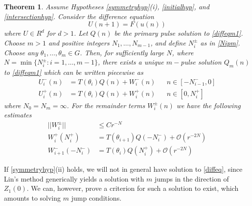 \documentclass[12pt]{article}
\newtheorem{theorem}{Theorem}
\begin{document}
\begin{theorem}\label{transversemulti}
Assume Hypotheses \ref{symmetryhyp}(i), \ref{initialhyp}, and \ref{intersectionhyp}. Consider the difference equation
\begin{equation}\label{diffeqm1}
U(n+1) = F(u(n))
\end{equation}
where $U \in R^d$ for $d > 1$. Let $Q(n)$ be the primary pulse solution to \eqref{diffeqm1}. Choose $m > 1$ and positive integers $N_1, \dots, N_{m-1}$, and define $N_i^\pm$ as in \eqref{Nipm}. Choose any $\theta_1, \dots, \theta_m \in G$. Then, for sufficiently large $N$, where $N = \min\{ N_i^\pm : i = 1, \dots, m-1 \}$, there exists a unique $m-$pulse solution $Q_m(n)$ to \eqref{diffeqm1} which can be written piecewise as 
\begin{align}
U_i^-(n) &= T(\theta_i) Q(n) + W_i^-(n) && n \in [-N_{i-1}^-, 0] \\
U_i^+(n) &= T(\theta_i) Q(n) + W_i^+(n) && n \in [0, N_i^+]
\end{align}
where $N_0 = N_m = \infty$. For the remainder terms $W_i^\pm(n)$ we have the following estimates
\begin{equation}\label{Westimates}
\begin{aligned}
||W_i^\pm|| &\leq C r^{-N} \\
W_i^+(N_i^+) &= T(\theta_{i+1}) Q(-N_i^-) + \mathcal{O}(r^{-2N}) \\
W_{i+1}^-(-N_i^-) &= T(\theta_i) Q(N_i^+) + \mathcal{O}(r^{-2N})
\end{aligned}
\end{equation}
\end{theorem}

If \ref{symmetryhyp}(ii) holds, we will not in general have solution to \eqref{diffeq}, since Lin's method generically yields a solution with $m$ jumps in the direction of $Z_1(0)$. We can, however, prove a criterion for such a solution to exist, which amounts to solving $m$ jump conditions.
\end{document}
